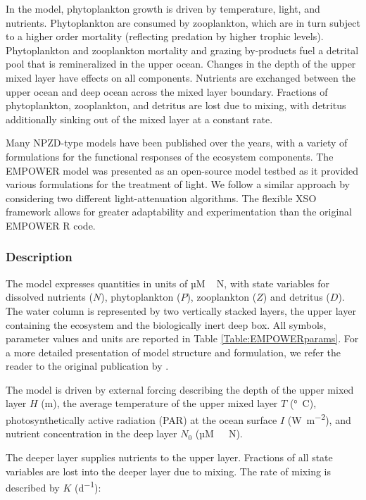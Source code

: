 \documentclass[journal abbreviation, manuscript]{copernicus}
\begin{document}
In the model, phytoplankton growth is driven by temperature, light, and nutrients. Phytoplankton are consumed by zooplankton, which are in turn subject to a higher order mortality (reflecting predation by higher trophic levels). Phytoplankton and zooplankton mortality and grazing by-products fuel a detrital pool that is remineralized in the upper ocean. Changes in the depth of the upper mixed layer have effects on all components. Nutrients are exchanged between the upper ocean and deep ocean across the mixed layer boundary. Fractions of phytoplankton, zooplankton, and detritus are lost due to mixing, with detritus additionally sinking out of the mixed layer at a constant rate.

Many NPZD-type models have been published over the years, with a variety of formulations for the functional responses of the ecosystem components. The EMPOWER model was presented as an open-source model testbed as it provided various formulations for the treatment of light. We follow a similar approach by considering two different light-attenuation algorithms. The flexible XSO framework allows for greater adaptability and experimentation than the original EMPOWER R code.

\subsubsection{Description}
The model expresses quantities in units of \unit{µM\,N}, with state variables for dissolved nutrients ($N$), phytoplankton ($P$), zooplankton ($Z$) and detritus ($D$). The water column is represented by two vertically stacked layers, the upper layer containing the ecosystem and the biologically inert deep box. All symbols, parameter values and units are reported in Table \ref{Table:EMPOWERparams}. For a more detailed presentation of model structure and formulation, we refer the reader to the original publication by \citet{Anderson2015c}.

The model is driven by external forcing describing the depth of the upper mixed layer $H$ (\unit{m}), the average temperature of the upper mixed layer $T$ (\unit{\degree C}), photosynthetically active radiation (PAR) at the ocean surface $I$ (\unit{W m^{-2}}), and nutrient concentration in the deep layer $N_0$ (\unit{µM \ N}). 

The deeper layer supplies nutrients to the upper layer. Fractions of all state variables are  lost into the deeper layer due to mixing. The rate of mixing is described by $K$ (\unit{d^{−1}}):
\end{document}
